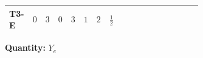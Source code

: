 \documentclass[8pt]{article}
\begin{document}
\begin{landscape}
\begin{longtable}{@{}llcccccc >{\raggedright\arraybackslash}p{0.21\linewidth} >{\raggedright\arraybackslash}p{0.21\linewidth} >{\raggedright\arraybackslash}p{0.21\linewidth}@{}}
\midrule
T3-E & $0$ & $3$ & $0$ & $3$ & $1$ & $2$ & $\frac{1}{2}$ & \scriptsize\adjustbox{max width=\linewidth}{$\begin{gathered} 3 \operatorname{Tr}\!\left({Y_d}\,\left({Y_d}\right)^{\dagger}\right) \left({Y_e}\right)_{ij}\end{gathered}$} & \scriptsize\adjustbox{max width=\linewidth}{$\begin{gathered} +3 \operatorname{Tr}\!\left({Y_u}\,\left({Y_u}\right)^{\dagger}\right) \left({Y_e}\right)_{ij}\end{gathered}$} & \scriptsize\adjustbox{max width=\linewidth}{$\begin{gathered} +\operatorname{Tr}\!\left({Y_e}\,\left({Y_e}\right)^{\dagger}\right) \left({Y_e}\right)_{ij}\end{gathered}$} \\
\midrule
\bottomrule
\end{longtable}
\clearpage
\noindent\textbf{Quantity: }$Y_e$\par\smallskip

\end{landscape}
\end{document}
